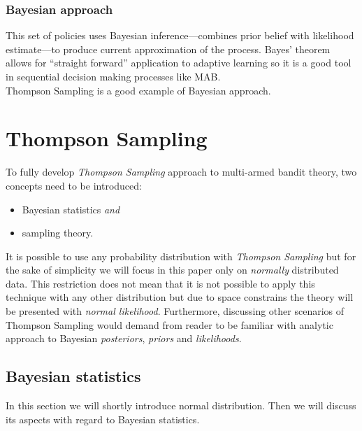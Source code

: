 \documentclass[12pt, a4paper, pdflatex, leqno]{report}
\begin{document}

\subsubsection{Bayesian approach}
This set of policies uses Bayesian inference---combines prior belief with likelihood estimate---to produce current approximation of the process. Bayes' theorem allows for ``straight forward'' application to adaptive learning so it is a good tool in sequential decision making processes like MAB.\\
Thompson Sampling is a good example of Bayesian approach.\\








\section{Thompson Sampling\label{sec:thompsonsampling}}
To fully develop \emph{Thompson Sampling} approach to multi-armed bandit theory, two concepts need to be introduced:
\begin{itemize}
\item Bayesian statistics \emph{and}
\item sampling theory.
\end{itemize}
It is possible to use any probability distribution with \emph{Thompson Sampling} but for the sake of simplicity we will focus in this paper only on \emph{normally} distributed data. This restriction does not mean that it is not possible to apply this technique with any other distribution but due to space constrains the theory will be presented with \emph{normal likelihood}. Furthermore, discussing other scenarios of Thompson Sampling would demand from reader to be familiar with analytic approach to Bayesian \emph{posteriors}, \emph{priors} and \emph{likelihoods}.

\subsection{Bayesian statistics\label{sec:bayesian}}
In this section we will shortly introduce normal distribution. Then we will discuss its aspects with regard to Bayesian statistics.
\end{document}
